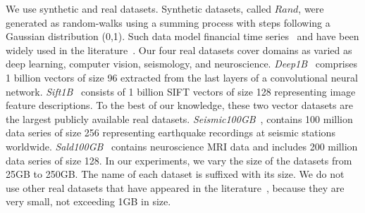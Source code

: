 {
We use synthetic and real datasets. Synthetic datasets, called $Rand$, were generated as random-walks using a summing process with steps following a Gaussian distribution (0,1). 
Such data model financial time series~\cite{conf/sigmod/Faloutsos1994} and have been widely used in the literature~\cite{conf/sigmod/Faloutsos1994,journal/kais/Camerra2014,conf/kdd/Zoumpatianos2015}. 
Our four real datasets cover domains as varied as deep learning, computer vision, seismology, and neuroscience. %
\emph{Deep1B}~\cite{url/data/deep1b} comprises 1 billion vectors of size 96 extracted from the last layers of a convolutional neural network. 
\emph{Sift1B}~\cite{conf/icassp/jegou2011,url/data/sift} consists of 1 billion SIFT vectors of size 128 representing image feature descriptions. 
To the best of our knowledge, these two vector datasets are the largest publicly available real datasets. 
\emph{Seismic100GB}~\cite{url/data/seismic}, contains 100 million data series of size 256 representing earthquake recordings at seismic stations worldwide. 
\emph{Sald100GB}~\cite{url/data/eeg} contains neuroscience MRI data and includes 200 million data series of size 128. 
In our experiments, we vary the size of the datasets from 25GB to 250GB. 
The name of each dataset is suffixed with its size. 
We do not use other real datasets that have appeared in the literature~\cite{UCRArchive,conf/sisap/martin17}, because they are very small, not exceeding 1GB in size. 


}

